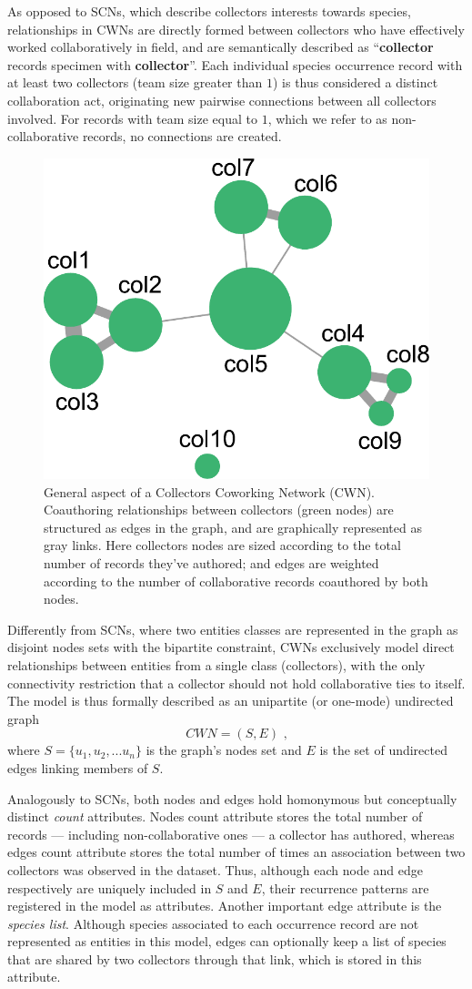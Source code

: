 As opposed to SCNs, which describe collectors interests towards species, relationships in CWNs are directly formed between collectors who have effectively worked collaboratively in field, and are semantically described as ``\textbf{collector} records specimen with \textbf{collector}''.
Each individual species occurrence record with at least two collectors (team size greater than $1$) is thus considered a distinct collaboration act, originating new pairwise connections between all collectors involved.
For records with team size equal to $1$, which we refer to as non-collaborative records, no connections are created.

  \begin{figure}[h!]
  	\centering
    \includegraphics[width=.4\linewidth]{figures/network_models/cwn_generalaspect.pdf}
    \caption{General aspect of a Collectors Coworking Network (CWN). Coauthoring relationships between collectors (green nodes) are structured as edges in the graph, and are graphically represented as gray links.
    Here collectors nodes are sized according to the total number of records they've authored; and edges are weighted according to the number of collaborative records coauthored by both nodes.}
    \label{fig:cwn_general}
  \end{figure}

Differently from SCNs, where two entities classes are represented in the graph as disjoint nodes sets with the bipartite constraint, CWNs exclusively model direct relationships between entities from a single class (collectors), with the only connectivity restriction that a collector should not hold collaborative ties to itself.
The model is thus formally described as an unipartite (or one-mode) undirected graph
$$CWN = (S,E) \mbox{ ,}$$
where $S=\{u_1,u_2,...u_n\}$ is the graph's nodes set and $E$ is the set of undirected edges linking members of $S$.

Analogously to SCNs, both nodes and edges hold homonymous but conceptually distinct \textit{count} attributes.
Nodes count attribute stores the total number of records --- including non-collaborative ones --- a collector has authored, whereas
edges count attribute stores the total number of times an association between two collectors was observed in the dataset. Thus, although each node and edge respectively are uniquely included in $S$ and $E$, their recurrence patterns are registered in the model as attributes.
Another important edge attribute is the \textit{species list}. Although species associated to each occurrence record are not represented as entities in this model, edges can optionally keep a list of species that are shared by two collectors through that link, which is stored in this attribute.

